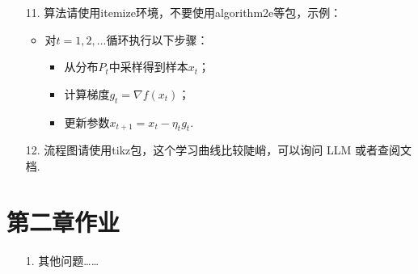 \documentclass{ctexart}
\begin{document}
\begin{enumerate}[wide, labelindent=0pt]
\item[11.] 算法请使用itemize环境，不要使用algorithm2e等包，示例：

\begin{itemize}
    \item 对$t=1,2,\ldots$循环执行以下步骤：
    \begin{itemize}
        \item 从分布$P_t$中采样得到样本$x_t$；
        \item 计算梯度$g_t=\nabla f(x_t)$；
        \item 更新参数$x_{t+1}=x_t-\eta_t g_t$. 
    \end{itemize}
\end{itemize}

\item[12.] 流程图请使用tikz包，这个学习曲线比较陡峭，可以询问 LLM 或者查阅文档. 
\end{enumerate}

\section{第二章作业}

\begin{enumerate}[wide, labelindent=0pt]
\item[1.] 其他问题……
\end{enumerate}
\end{document}
